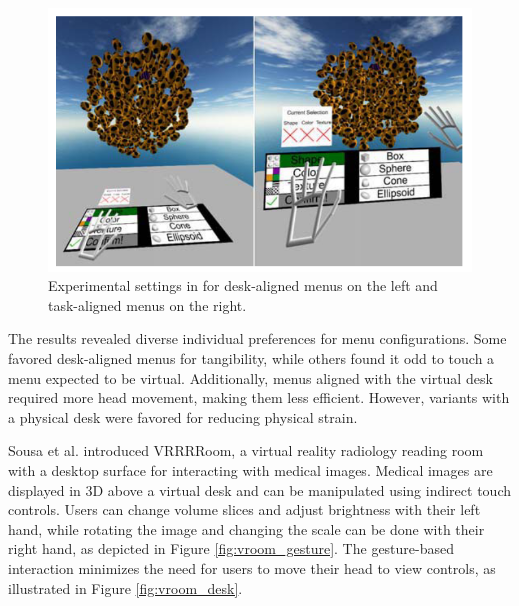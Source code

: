     \begin{figure}[h!]
        \centering
        \includegraphics[width=0.85\linewidth]{sota_desk_menu.png}
        \caption{Experimental settings in \cite{zielaskoMenusDeskSystem2019} for desk-aligned menus on the left and task-aligned menus on the right.}
        \label{fig:sota_desk_z2}
    \end{figure}

    The results revealed diverse individual preferences for menu configurations. Some favored desk-aligned menus for tangibility, while others found it odd to touch a menu expected to be virtual. Additionally, menus aligned with the virtual desk required more head movement, making them less efficient. However, variants with a physical desk were favored for reducing physical strain.
    
    Sousa et al. \cite{sousaVRRRRoomVirtualReality2017} introduced VRRRRoom, a virtual reality radiology reading room with a desktop surface for interacting with medical images. Medical images are displayed in 3D above a virtual desk and can be manipulated using indirect touch controls. Users can change volume slices and adjust brightness with their left hand, while rotating the image and changing the scale can be done with their right hand, as depicted in Figure \ref{fig:vroom_gesture}. The gesture-based interaction minimizes the need for users to move their head to view controls, as illustrated in Figure \ref{fig:vroom_desk}.

